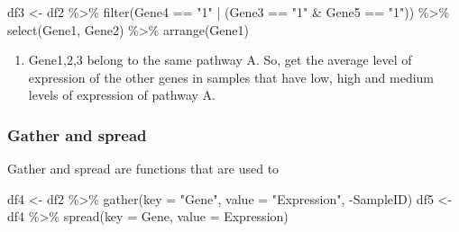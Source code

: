 \documentclass[
]{article}
\newenvironment{Shaded}{\begin{snugshade}}{\end{snugshade}}
\newcommand{\AttributeTok}[1]{\textcolor[rgb]{0.77,0.63,0.00}{#1}}
\newcommand{\FunctionTok}[1]{\textcolor[rgb]{0.00,0.00,0.00}{#1}}
\newcommand{\NormalTok}[1]{#1}
\newcommand{\OtherTok}[1]{\textcolor[rgb]{0.56,0.35,0.01}{#1}}
\newcommand{\SpecialCharTok}[1]{\textcolor[rgb]{0.00,0.00,0.00}{#1}}
\newcommand{\StringTok}[1]{\textcolor[rgb]{0.31,0.60,0.02}{#1}}
\providecommand{\tightlist}{%
  \setlength{\itemsep}{0pt}\setlength{\parskip}{0pt}}
\begin{document}
\begin{Shaded}
\begin{Highlighting}[]
\NormalTok{df3 }\OtherTok{\textless{}{-}}\NormalTok{ df2 }\SpecialCharTok{\%\textgreater{}\%} \FunctionTok{filter}\NormalTok{(Gene4 }\SpecialCharTok{==} \StringTok{"1"} \SpecialCharTok{|}\NormalTok{ (Gene3 }\SpecialCharTok{==} \StringTok{"1"} \SpecialCharTok{\&}\NormalTok{ Gene5 }\SpecialCharTok{==} \StringTok{"1"}\NormalTok{)) }\SpecialCharTok{\%\textgreater{}\%}
    \FunctionTok{select}\NormalTok{(Gene1, Gene2) }\SpecialCharTok{\%\textgreater{}\%} \FunctionTok{arrange}\NormalTok{(Gene1)}
\end{Highlighting}
\end{Shaded}

\begin{enumerate}
\def\labelenumi{\arabic{enumi}.}
\setcounter{enumi}{5}
\tightlist
\item
  Gene1,2,3 belong to the same pathway A. So, get the average level of
  expression of the other genes in samples that have low, high and
  medium levels of expression of pathway A.
\end{enumerate}

\hypertarget{gather-and-spread}{%
\subsubsection{Gather and spread}\label{gather-and-spread}}

Gather and spread are functions that are used to

\begin{Shaded}
\begin{Highlighting}[]
\NormalTok{df4 }\OtherTok{\textless{}{-}}\NormalTok{ df2 }\SpecialCharTok{\%\textgreater{}\%} \FunctionTok{gather}\NormalTok{(}\AttributeTok{key =}  \StringTok{"Gene"}\NormalTok{, }\AttributeTok{value =} \StringTok{"Expression"}\NormalTok{, }\SpecialCharTok{{-}}\NormalTok{SampleID)}
\NormalTok{df5 }\OtherTok{\textless{}{-}}\NormalTok{ df4 }\SpecialCharTok{\%\textgreater{}\%} \FunctionTok{spread}\NormalTok{(}\AttributeTok{key =}\NormalTok{ Gene, }\AttributeTok{value =}\NormalTok{ Expression)}
\end{Highlighting}
\end{Shaded}
\end{document}
